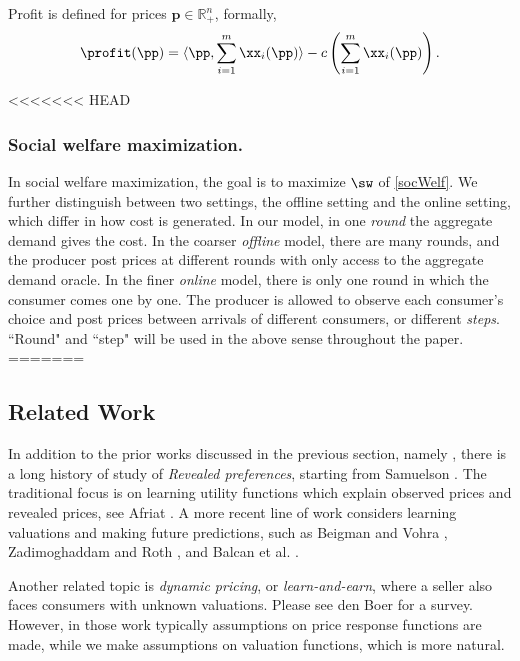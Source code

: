 Profit is defined for prices $\mathbf{p}\in \mathbb{R}_+^n$, formally,
\begin{equation}\label{eq:profit}
\profit(\pp) = \langle \pp, \sum_{i=1}^m \xx_i(\pp)\rangle - c\left(\sum_{i=1}^m \xx_i(\pp)\right).
\end{equation}

<<<<<<< HEAD
\subsubsection{Social welfare maximization.}
In social welfare maximization, the goal is to maximize $\sw$ of \eqref{socWelf}. We further distinguish between two settings, the offline setting and the online setting, which differ in how cost is generated. In our model, in one \emph{round} the aggregate demand gives the cost. In the coarser \emph{offline} model, there are many rounds, and the producer post prices at different rounds with only access to the aggregate demand oracle. In the finer \emph{online} model, there is only one round in which the consumer comes one by one. The producer is allowed to observe each consumer's choice and post prices between arrivals of different consumers, or different \emph{steps}. ``Round" and ``step" will be used in the above sense throughout the paper.
=======
\subsection{Related Work}\label{sec:relWork}
In addition to the prior works discussed in the previous section, namely \cite{RUW16, RSUW17}, there is a long history of study of \emph{Revealed preferences}, starting from Samuelson \cite{S38}. 
The traditional focus is on learning utility functions which explain observed prices and revealed prices, see Afriat \cite{A67}. A more recent line of work considers learning valuations and making future predictions, such as Beigman and Vohra \cite{BV06}, Zadimoghaddam and Roth \cite{ZR12}, and Balcan et al. \cite{BDMUV14}. 

Another related topic is \emph{dynamic pricing}, or \emph{learn-and-earn}, where a seller also faces consumers with unknown valuations. Please see den Boer \cite{dB15} for a survey. However, in those work typically assumptions on price response functions are made, while we make assumptions on valuation functions, which is more natural.

